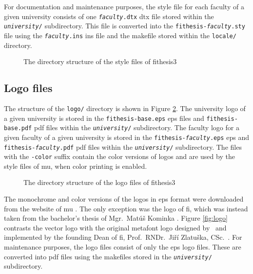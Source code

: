 \documentclass[digital,table,color]{fithesis3/fithesis3}
\makeatletter
\def\thesis#1{\makeatletter\thesis@{#1}\makeatother}
\makeatother
\begin{document}
  For documentation and maintenance purposes, the style file for
  each faculty of a given university consists of one
  \texttt{\textit{faculty}.dtx} \gls{dtx} file stored within the
  \texttt{\textit{university}/} subdirectory. This file is
  converted into the \texttt{fithesis-\textit{faculty}.sty} file
  using the \texttt{\textit{faculty}.ins} \gls{ins} file and the
  \gls{makefile} stored within the \texttt{locale/} directory.
  
  \begin{figure}
    \centering
    \parbox{0.5\textwidth}{}
    \caption{The directory structure of the style files of
      \textsf{fithesis3}}
    \label{fig:dirs-style}
  \end{figure}
  
  \subsection{Logo files}
  The structure of the \texttt{logo/} directory is shown in Figure
  \ref{fig:dirs-logo}. The university logo of a given university is
  stored in the \texttt{fithesis-base.eps} \gls{eps} files and
  \texttt{fithesis-base.pdf} \gls{pdf} files within the
  \texttt{\textit{university}/} subdirectory. The faculty logo for
  a given faculty of a given university is stored in the
  \texttt{fithesis-\textit{faculty}.eps} \gls{eps} and
  \texttt{fithesis-\textit{faculty}.pdf} \gls{pdf} files within the
  \texttt{\textit{university}/} subdirectory. The files with the
  \texttt{-color} suffix contain the color versions of logos and
  are used by the style files of \gls{mu}, when color printing is
  enabled.

  \begin{figure}
    \centering
    \parbox{0.6\textwidth}{}
    \caption{The directory structure of the logo files of
      \textsf{fithesis3}}
    \label{fig:dirs-logo}
  \end{figure}
  
  The monochrome and color versions of the logos in \gls{eps}
  format were downloaded from the website of \gls{mu} \cite{muvis}.
  The only exception was the logo of \gls{fi}, which was instead
  taken from the bachelor's thesis of Mgr.\ Matúš Kominka
  \cite{Kominka08}. Figure \ref{fig:logo} contrasts the vector logo
  with the original \gls{metafont} logo designed by
  \thesis{advisor}\ and implemented by the founding Dean of
  \gls{fi}, Prof.\ RNDr.\ Jiří Zlatuška, CSc.~\cite{filogo}.  For
  maintenance purposes, the logo files consist of only the
  \gls{eps} logo files. These are converted into \gls{pdf} files
  using the \glspl{makefile} stored in the
  \texttt{\textit{university}/} subdirectory.
\end{document}
